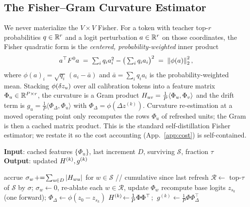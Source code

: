 \subsection{The Fisher--Gram Curvature Estimator}
\label{app:estimator}
We never materialize the $V{\times}V$ Fisher. For a token with teacher top-$r$ probabilities
$q\in\mathbb{R}^r$ and a logit perturbation $a\in\mathbb{R}^r$ on those coordinates, the Fisher quadratic form is the
\emph{centered, probability-weighted} inner product
\begin{equation}
a^\top F^0 a \;=\; \textstyle\sum_i q_i a_i^2-\big(\sum_i q_i a_i\big)^2
\;=\;\left\lVert \phi(a) \right\rVert_2^2,
\label{eq:phi}
\end{equation}
where $\phi(a)_i=\sqrt{q_i}\,(a_i-\bar a)$ and $\bar a=\sum_i q_i a_i$ is the probability-weighted
mean. Stacking $\phi(\delta z_u)$ over all calibration tokens into a feature matrix
$\Phi_u\in\mathbb{R}^{P\times r}$, the curvature is a Gram product
$H_{uv}=\tfrac1P\langle\Phi_u,\Phi_v\rangle$ and the drift term is
$g_u=\tfrac1P\langle\Phi_{\Delta},\Phi_u\rangle$ with $\Phi_\Delta=\phi(\Delta z^{(k)})$. Curvature
re-estimation at a moved operating point only recomputes the rows $\Phi_u$ of refreshed units; the
Gram is then a cached matrix product. This is the standard self-distillation Fisher estimator; we restate
it so the cost accounting (App.~\ref{app:cost}) is self-contained.

\begin{algorithm}[t]
\caption{Interaction-Flagged Refresh (step $k>0$)}
\label{alg:refresh}
\textbf{Input}: cached features $\{\Phi_u\}$, last increment $D$, surviving $\mathcal{S}$, fraction $\tau$\\
\textbf{Output}: updated $H^{(k)},g^{(k)}$
\begin{algorithmic}[1]
\STATE accrue $\sigma_w\!\mathrel{+}=\!\sum_{u\in D}|H_{wu}|$ for $w\in\mathcal{S}$ \hfill // cumulative since last refresh
\STATE $\mathcal{R}\!\leftarrow$ top-$\tau$ of $\mathcal{S}$ by $\sigma$; $\sigma_w\!\leftarrow\!0$, re-ablate each $w\!\in\!\mathcal{R}$, update $\Phi_w$
\STATE recompute base logits $z_{s_k}$ (one forward); $\Phi_\Delta\!\leftarrow\!\phi(z_0-z_{s_k})$
\STATE $H^{(k)}\!\leftarrow\!\tfrac1P\Phi\Phi^\top$; $\ g^{(k)}\!\leftarrow\!\tfrac1P\Phi\Phi_\Delta^\top$
\end{algorithmic}
\end{algorithm}

